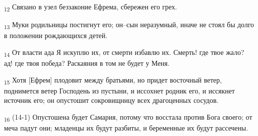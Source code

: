 \begin{tcolorbox}
\textsubscript{12} Связано в узел беззаконие Ефрема, сбережен его грех.
\end{tcolorbox}
\begin{tcolorbox}
\textsubscript{13} Муки родильницы постигнут его; он--сын неразумный, иначе не стоял бы долго в положении рождающихся детей.
\end{tcolorbox}
\begin{tcolorbox}
\textsubscript{14} От власти ада Я искуплю их, от смерти избавлю их. Смерть! где твое жало? ад! где твоя победа? Раскаяния в том не будет у Меня.
\end{tcolorbox}
\begin{tcolorbox}
\textsubscript{15} Хотя [Ефрем] плодовит между братьями, но придет восточный ветер, поднимется ветер Господень из пустыни, и иссохнет родник его, и иссякнет источник его; он опустошит сокровищницу всех драгоценных сосудов.
\end{tcolorbox}
\begin{tcolorbox}
\textsubscript{16} (14-1) Опустошена будет Самария, потому что восстала против Бога своего; от меча падут они; младенцы их будут разбиты, и беременные их будут рассечены.
\end{tcolorbox}
